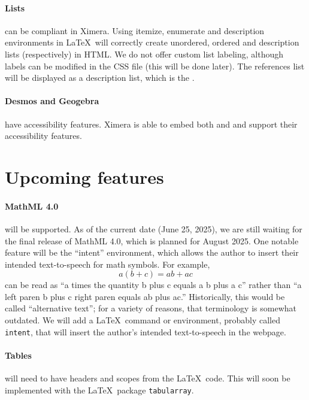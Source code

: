 \documentclass{ximera}
\begin{document}
\paragraph{Lists} can be compliant in Ximera.
Using itemize, enumerate and description environments in \LaTeX\ will correctly create unordered, ordered and description lists (respectively) in HTML. We do not offer custom list labeling, although
labels can be modified in the CSS file (this will be done later). The references list will be displayed as a description list, which is the .

\paragraph{Desmos and Geogebra} have accessibility features.
Ximera is able to embed both  and  and support their accessibility features.


\section{Upcoming features}

\paragraph{MathML 4.0} will be supported.
As of the current date (June 25, 2025), we are still waiting for the final release of MathML 4.0, which is planned for August 2025.
One notable feature will be the ``intent'' environment, which allows the author to insert their intended text-to-speech for
math symbols. For example, 
\[
a(b+c) = ab + ac
\]
can be read as ``a times the quantity b plus c equals a b plus a c'' rather than ``a left paren b plus c right paren equals ab plus ac.''
Historically, this would be called ``alternative text''; for a variety of reasons, that terminology is somewhat outdated. 
We will add a \LaTeX\ command or environment, probably called \verb!intent!, that will insert the author's intended text-to-speech in the
webpage. 

\paragraph{Tables}
will need to have headers and scopes from the \LaTeX\ code. This will soon be implemented with the \LaTeX\ package \verb!tabularray!. 
\end{document}
